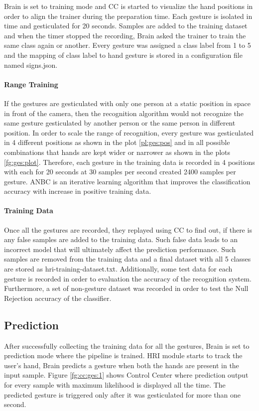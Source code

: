 

Brain is set to training mode and CC is started to visualize the hand positions in order to align the trainer during the preparation time. Each gesture is isolated in time and gesticulated for 20 seconds. Samples are added to the training dataset and when the timer stopped the recording, Brain asked the trainer to train the same class again or another. Every gesture was assigned a class label from 1 to 5 and the mapping of class label to hand gesture is stored in a configuration file named signs.json. 

\paragraph*{Range Training} If the gestures are gesticulated with only one person at a static position in space in front of the camera, then the recognition algorithm would not recognize the same gesture gesticulated by another person or the same person in different position. In order to scale the range of recognition, every gesture was gesticulated in 4 different positions as shown in the plot \ref{pl:ges:pos} and in all possible combinations that hands are kept wider or narrower as shown in the plots \ref{fg:ges:plot}. Therefore, each gesture in the training data is recorded in 4 positions with each for 20 seconds at 30 samples per second created 2400 samples per gesture. ANBC is an iterative learning algorithm that improves the classification accuracy with increase in positive training data. 



\paragraph*{Training Data} Once all the gestures are recorded, they replayed using CC to find out, if there is any false samples are added to the training data. Such false data leads to an incorrect model that will ultimately affect the prediction performance. Such samples are removed from the training data and a final dataset with all 5 classes are stored as hri-training-dataset.txt. Additionally, some test data for each gesture is recorded in order to evaluation the accuracy of the recognition system. Furthermore, a set of non-gesture dataset was recorded in order to test the Null Rejection accuracy of the classifier. 

\subsection{Prediction} After successfully collecting the training data for all the gestures, Brain is set to prediction mode where the pipeline is trained. HRI module starts to track the user's hand, Brain predicts a gesture when both the hands are present in the input sample. Figure \ref{fg:cc:ges:1} shows Control Center where prediction output for every sample with maximum likelihood is displayed all the time. The predicted gesture is triggered only after it was gesticulated for more than one second.


